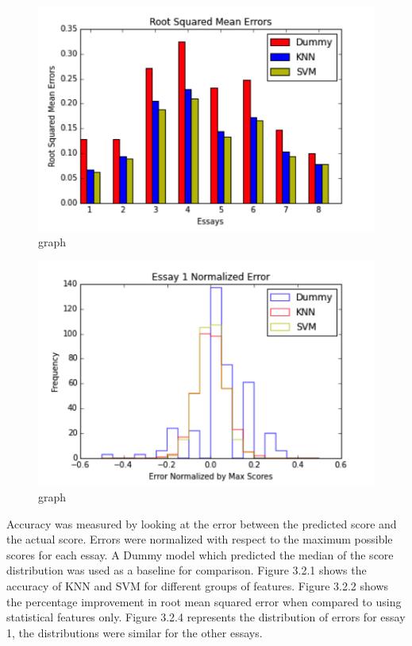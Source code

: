 \documentclass{article}
\begin{document}
\begin{figure}[H]
\centering
\centerline{\includegraphics[width=\columnwidth]{"323"}}
\vspace{-1em}
\caption{graph}
\label{323}
\vskip -0.2in
\end{figure} 
\begin{figure}[H]
\centering
\centerline{\includegraphics[width=\columnwidth]{"324"}}
\vspace{-1em}
\caption{graph}
\label{324}
\end{figure}
Accuracy was measured by looking at the error between the predicted score and the actual score. Errors were normalized with respect to the maximum possible scores for each essay. A Dummy model which predicted the median of the score distribution was used as a baseline for comparison. Figure 3.2.1 shows the accuracy of KNN and SVM for different groups of features. Figure 3.2.2 shows the percentage improvement in root mean squared error when compared to using statistical features only. Figure 3.2.4 represents the distribution of errors for essay 1, the distributions were similar for the other essays. 
\end{document}
